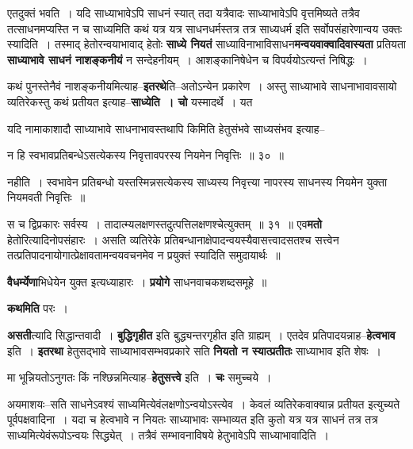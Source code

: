 \documentclass[article,12pt,a4paper]{memoir}
\begin{document}
	  \pstart एतदुक्तं भवति । यदि साध्याभावेऽपि साधनं स्यात् तदा यत्रैवादः साध्याभावेऽपि वृत्तमिष्यते तत्रैव तत्साधनमप्यस्ति न च साध्यमिति कथं यत्र यत्र साधनधर्मस्तत्र तत्र साध्यधर्म इति सर्वोपसंहारेणान्वय उक्तः स्यादिति । तस्माद् हेतोरन्वयाभावाद् हेतोः \textbf{साध्ये नियतं} साध्याविनाभाविसाधन\textbf{मन्वयवाक्वादिवा}\textbf{स्यता} प्रतियता \textbf{साध्याभावे साधनं नाशङ्कनीयं} न सन्देहनीयम् । आशङ्कानिषेधेन च विपर्ययोऽत्यन्तं निषिद्धः ।
	\pend
      

	  \pstart कथं पुनस्तेनैवं नाशङ्कनीयमित्याह--\textbf{इतरथे}ति--अतोऽन्येन प्रकारेण । अस्तु साध्याभावे साधनाभावावसायो व्यतिरेकस्तु कथं प्रतीयत इत्याह--\textbf{साध्येति । चो} यस्मादर्थे । यत  \leavevmode{} 
	  
	यदि नामाकाशादौ साध्याभावे साधनाभावस्तथापि किमिति हेतुसंभवे साध्यसंभव इत्याह--  
	  
	न हि स्वभावप्रतिबन्धेऽसत्येकस्य निवृत्तावपरस्य नियमेन निवृत्तिः ॥ ३० ॥ 
	  
	नहीति । स्वभावेन प्रतिबन्धो यस्तस्मिन्नसत्येकस्य साध्यस्य निवृत्त्या नापरस्य साधनस्य नियमेन युक्ता नियमवती निवृत्तिः ॥  
	  
	स च द्विप्रकारः सर्वस्य । तादात्म्यलक्षणस्तदुत्पत्तिलक्षणश्चेत्युक्तम् ॥ ३१ ॥ एव\textbf{मतो} हेतोरित्यादिनोपसंहारः । असति व्यतिरेके प्रतिबन्धानाक्षेपादन्वयस्यैवासत्त्वादसतश्च सत्त्वेन तत्प्रतिपादनायोगात्प्रेक्षावतामन्वयवचनमेव न प्रयुक्तं स्यादिति समुदायार्थः ॥
	\pend
      

	  \pstart \textbf{वैधर्म्येणा}भिधेयेन युक्त इत्यध्याहारः । \textbf{प्रयोगे} साधनवाचकशब्दसमूहे ॥
	\pend
      

	  \pstart \textbf{कथमिति} परः ।
	\pend
      

	  \pstart \textbf{असती}त्यादि सिद्धान्तवादी । \textbf{बुद्धिगृहीत} इति बुद्ध्यन्तरगृहीत इति ग्राह्यम् । एतदेव प्रतिपादयन्नाह--\textbf{हेत्वभाव} इति । \textbf{इतरथा} हेतुसद्भावे साध्याभावसम्भवप्रकारे सति \textbf{नियतो न स्यात्प्रतीतः} साध्याभाव इति शेषः ।
	\pend
      

	  \pstart मा भून्नियतोऽनुगतः किं नश्छिन्नमित्याह--\textbf{हेतुसत्त्वे} इति । \textbf{चः} समुच्चये ।
	\pend
      

	  \pstart अयमाशयः--सति साधनेऽवश्यं साध्यमित्येवंलक्षणोऽन्वयोऽस्त्येव । केवलं व्यतिरेकवाक्यान्न प्रतीयत इत्युच्यते पूर्वपक्षवादिना । यदा च हेत्वभावे न नियतः साध्याभावः सम्भाव्यत इति कुतो यत्र यत्र साधनं तत्र तत्र साध्यमित्येवंरूपोऽन्वयः सिद्ध्येत् । तत्रैवं सम्भावनाविषये हेतुभावेऽपि साध्याभावादिति ।
	\pend
      
\end{document}
